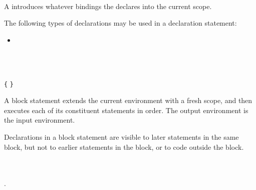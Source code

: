 
\begin{Syntax}
	 \\
\end{Syntax}

A  introduces whatever bindings the  declares into the current scope.

The following types of declarations may be used in a declaration statement:

\begin{itemize}
\item {}
\end{itemize}

\begin{Checking}

 \\

\end{Checking}


\begin{Syntax}
	 \\
		\lstinline|{| \SynStar \lstinline|}|
\end{Syntax}

A block statement extends the current environment with a fresh scope,
and then executes each of its constituent statements in order.
The output environment is the input environment.

\begin{Note}
Declarations in a block statement are visible to later statements in the same block, but not to earlier statements in the block, or to code outside the block.
\end{Note}

\begin{Checking}

	 \\
	 \\

	.\\

	 \\
	 \\
	 \\

\end{Checking}

